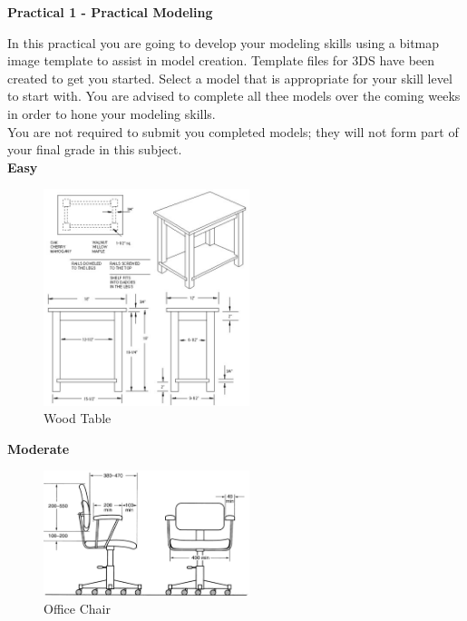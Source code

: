 
	
\begin{flushleft}
\Large\textbf{Practical 1 - Practical Modeling }\\
\end{flushleft}

In this practical you are going to develop your modeling skills using a bitmap image template to assist in model creation.  Template files for 3DS have been created to get you started.  Select a model that is appropriate for your skill level to start with.  You are advised to complete all thee models over the coming weeks in order to hone your modeling skills.\\

You are not required to submit you completed models; they will not form part of your final grade in this subject.\\

\vspace{1cm}
\textbf{Easy}\\
\begin{figure}[hb]
	\centering
		\includegraphics[width=6cm]{./img/wood-furniture-plans-1.jpg}
		\caption{Wood Table}
	\label{fig:Table}
\end{figure}


\newpage
\vspace{1cm}
\textbf{Moderate}\\
\begin{figure}[hb]
	\centering
		\includegraphics[width=6cm]{./img/office-chair-2.jpg}
		\caption{Office Chair}
	\label{fig:Office Chair}
\end{figure}


